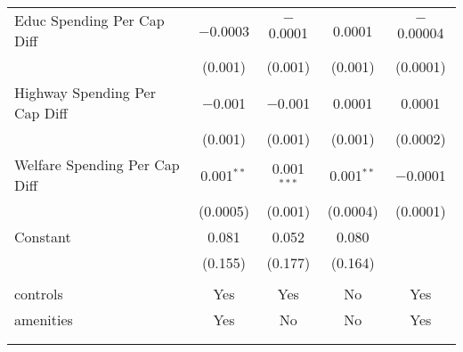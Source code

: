 \begin{table}[!htbp]
\begin{tabular}{@{\extracolsep{5pt}}lcccc}
  Educ Spending Per Cap Diff & $-$0.0003 & $-$0.0001 & 0.0001 & $-$0.00004 \\ 
  & (0.001) & (0.001) & (0.001) & (0.0001) \\ 
  Highway Spending Per Cap Diff & $-$0.001 & $-$0.001 & 0.0001 & 0.0001 \\ 
  & (0.001) & (0.001) & (0.001) & (0.0002) \\ 
  Welfare Spending Per Cap Diff & 0.001$^{**}$ & 0.001$^{***}$ & 0.001$^{**}$ & $-$0.0001 \\ 
  & (0.0005) & (0.001) & (0.0004) & (0.0001) \\ 
  Constant & 0.081 & 0.052 & 0.080 &  \\ 
  & (0.155) & (0.177) & (0.164) &  \\ 
 \hline \\[-1.8ex] 
controls & Yes & Yes & No & Yes \\ 
amenities & Yes & No & No & Yes \\ 
\hline \\[-1.8ex] 
\hline 
\hline \\[-1.8ex] 
\end{tabular} 
\end{table} 
